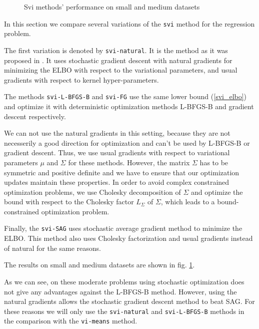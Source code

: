\begin{figure}[t!]
	\centering

	\subfloat{
		\scalebox{0.75}{
			
		}
	}
	\subfloat{
		\scalebox{0.75}{
    		
		}
	}
	\vspace{0.1cm}
	\subfloat{
		\scalebox{0.75}{
			
		}
	}
	\subfloat{
		\scalebox{0.75}{
    		
		}
	}
	\caption{Svi methods' performance on small and medium datasets}
	\label{svi_results}
\end{figure}
In this section we compare several variations of the \lstinline{svi} method for the regression problem.

The first variation is denoted by \lstinline{svi-natural}. It is the method as it was proposed in \cite{BigData}. It uses stochastic gradient descent with natural gradients for minimizing the ELBO with respect to the variational parameters, and usual gradients with respect to kernel hyper-parameters.

The methods \lstinline{svi-L-BFGS-B} and \lstinline{svi-FG} use the same lower bound (\ref{svi_elbo}) and optimize it with deterministic optimization methods L-BFGS-B and gradient descent respectively. 

We can not use the natural gradients in this setting, because they are not necesserily a good direction for optimization and can't be used by L-BFGS-B or gradient descent. Thus, we use usual gradients with respect to variational parameters $\mu$ and $\Sigma$ for these methods. However, the matrix $\Sigma$ has to be symmetric and positive definite and we have to ensure that our optimization updates maintain these properties. In order to avoid complex constrained optimization problems, we use Cholesky decomposition of $\Sigma$ and optimize the bound with respect to the Cholesky factor $L_\Sigma$ of $\Sigma$, which leads to a bound-constrained optimization problem.

Finally, the \lstinline{svi-SAG} uses stochastic average gradient method to minimize the ELBO. This method also uses Cholesky factorization and usual gradients instead of natural for the same reasons.


The results on small and medium datasets are shown in fig. \ref{svi_results}.

As we can see, on these moderate problems using stochastic optimization does not give any advantages against the L-BFGS-B method. However, using the natural gradients allows the stochastic gradient descent method to beat SAG. For these reasons we will only use the \lstinline{svi-natural} and \lstinline{svi-L-BFGS-B} methods in the comparison with the \lstinline{vi-means} method.